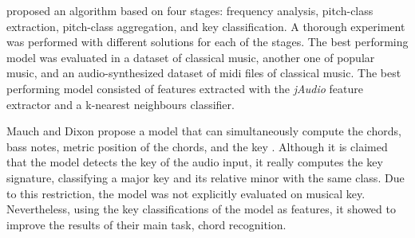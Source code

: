 \textcite{campbell2010automatic} proposed an algorithm based
on four stages: frequency analysis, pitch-class extraction,
pitch-class aggregation, and key classification. A thorough
experiment was performed with different solutions for each
of the stages. The best performing model was evaluated in a
dataset of classical music, another one of popular music,
and an audio-synthesized dataset of \gls{midi} files of
classical music. The best performing model consisted of
features extracted with the \emph{jAudio} feature extractor
\parencite{mcennis2005jaudio} and a k-nearest neighbours
classifier.

Mauch and Dixon propose a model that can simultaneously
compute the chords, bass notes, metric position of the
chords, and the key \textcite{mauch2010simultaneous}.
Although it is claimed that the model detects the key of the
audio input, it really computes the key signature,
classifying a major key and its relative minor with the same
class. Due to this restriction, the model was not explicitly
evaluated on musical key. Nevertheless, using the key
classifications of the model as features, it showed to
improve the results of their main task, chord recognition.













